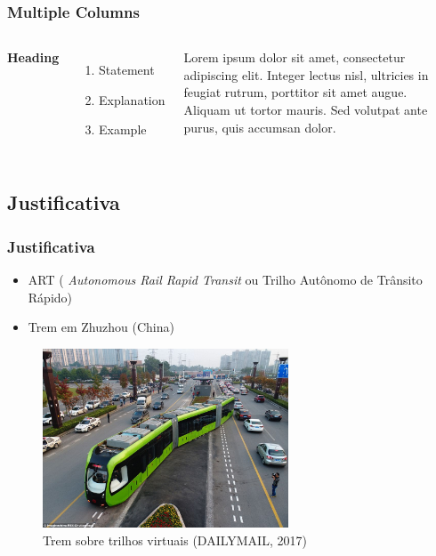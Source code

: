 
\begin{frame}
\frametitle{Multiple Columns}
\begin{columns}[c] %

\textbf{Heading}
\begin{enumerate}
\item Statement
\item Explanation
\item Example
\end{enumerate}

Lorem ipsum dolor sit amet, consectetur adipiscing elit. Integer lectus nisl, ultricies in feugiat rutrum, porttitor sit amet augue. Aliquam ut tortor mauris. Sed volutpat ante purus, quis accumsan dolor.

\end{columns}
\end{frame}

\subsection{Justificativa}



\begin{frame}
\frametitle{Justificativa}

\begin{itemize}
\item ART (\textit{ Autonomous Rail Rapid Transit} ou Trilho Autônomo de Trânsito Rápido)
\item Trem em Zhuzhou (China)
\end{itemize}

\begin{figure}[]
 \centering
 \captionsetup{width=0.65\textwidth,font=footnotesize,textfont=bf}
 \includegraphics[width=0.65\textwidth,keepaspectratio]{Figuras/Trem.jpg}
 \caption{Trem sobre trilhos virtuais (DAILYMAIL, 2017)}
\end{figure}


\end{frame}



